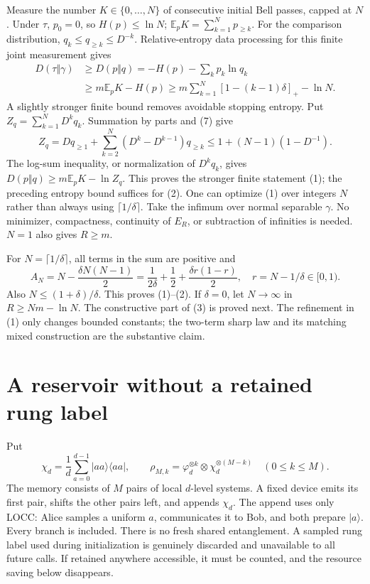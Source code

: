 \documentclass[11pt,a4paper]{article}
\newcommand{\ER}{E_R}
\newcommand{\ph}{\varphi}
\begin{document}
Measure the number \(K\in\{0,\ldots,N\}\) of consecutive initial Bell passes,
capped at \(N\). Under \(\tau\), \(p_0=0\), so \(H(p)\le\ln N\);
\(\mathbb E_pK=\sum_{k=1}^Np_{\ge k}\).
For the comparison distribution, \(q_k\le q_{\ge k}\le D^{-k}\).
Relative-entropy data processing for this finite joint measurement gives
\[
\begin{split}
 D(\tau\Vert\gamma)
 &\ge D(p\Vert q)
   =-H(p)-\sum_kp_k\ln q_k\\
 &\ge m\mathbb E_pK-H(p)
 \ge m\sum_{k=1}^N[1-(k-1)\delta]_+-\ln N.
\end{split}
\]
A slightly stronger finite bound removes avoidable stopping entropy.
Put \(Z_q=\sum_{k=1}^N D^kq_k\). Summation by parts and (7) give
\[
 Z_q=Dq_{\ge1}+\sum_{k=2}^N(D^k-D^{k-1})q_{\ge k}
       \le 1+(N-1)(1-D^{-1}).
\]
The log-sum inequality, or normalization of \(D^kq_k\), gives
\(D(p\Vert q)\ge m\mathbb E_pK-\ln Z_q\).
This proves the stronger finite statement (1); the preceding entropy bound
suffices for (2). One can optimize (1) over integers \(N\) rather than always
using \(\lceil1/\delta\rceil\).
Take the infimum over normal separable \(\gamma\).
No minimizer, compactness, continuity of \(\ER\), or subtraction of infinities
is needed. \(N=1\) also gives \(R\ge m\).

For \(N=\lceil1/\delta\rceil\), all terms in the sum are positive and
\[
 A_N=N-\frac{\delta N(N-1)}2
 =\frac1{2\delta}+\frac12+\frac{\delta r(1-r)}2,\quad
 r=N-1/\delta\in[0,1).
\]
Also \(N\le(1+\delta)/\delta\). This proves (1)--(2).
If \(\delta=0\), let \(N\to\infty\) in \(R\ge Nm-\ln N\).
The constructive part of (3) is proved next. The refinement in (1) only
changes bounded constants; the two-term sharp law and its matching mixed
construction are the substantive claim.

\section{A reservoir without a retained rung label}
Put
\[
 \chi_d=\frac1d\sum_{a=0}^{d-1}|aa\rangle\langle aa|,\qquad
 \rho_{M,k}=\ph_d^{\otimes k}\otimes\chi_d^{\otimes(M-k)}
 \quad(0\le k\le M).
\]
The memory consists of \(M\) pairs of local \(d\)-level systems.
A fixed device emits its first pair, shifts the other pairs left, and appends
\(\chi_d\). The append uses only LOCC: Alice samples a uniform \(a\),
communicates it to Bob, and both prepare \(|a\rangle\).
Every branch is included. There is no fresh shared entanglement.
A sampled rung label used during initialization is genuinely discarded and
unavailable to all future calls. If retained anywhere accessible, it must be
counted, and the resource saving below disappears.
\end{document}
